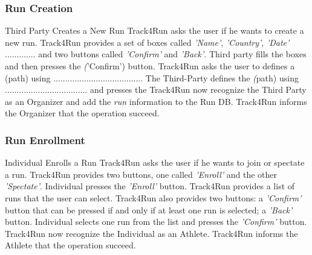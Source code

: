\documentclass[a4paper]{article}
\begin{document}
        
        \subsubsection{Run Creation}
        
        \begin{usecase}{Third Party Creates a New Run}
              {Track4Run asks the user if he wants to create a new run. Track4Run provides a set of boxes called \textit{'Name'}, \textit{'Country'}, \textit{'Date'} ............. and two buttons called \textit{'Confirm'} and \textit{'Back'}.}
              {Third party fills the boxes and then presses the \textit('Confirm') button.}
              {Track4Run asks the user to defines a \texit(path) using ......................................}
              {The Third-Party defines the \textit(path) using ................................... and presses the }
              {Track4Run now recognize the Third Party as an Organizer and add the \textit{run} information to the Run DB.}
              {Track4Run informs the Organizer that the operation succeed.}
        \end{usecase}
        
        \subsubsection{Run Enrollment}
        
        \begin{usecase}{Individual Enrolls a Run}
              {Track4Run asks the user if he wants to join or spectate a run. Track4Run provides two buttons, one called \textit{'Enroll'} and the other \textit{'Spectate'}.}
              {Individual presses the \textit{'Enroll'} button.}
              {Track4Run provides a list of runs that the user can select. Track4Run also provides two buttons: a \textit{'Confirm'} button that can be pressed if and only if at least one run is selected; a \textit{'Back'} button.}
              {Individual selects one run from the list and presses the \textit{'Confirm'} button.}
              {Track4Run now recognize the Individual as an Athlete.}
              {Track4Run informs the Athlete that the operation succeed.}
        \end{usecase}
        
\end{document}
